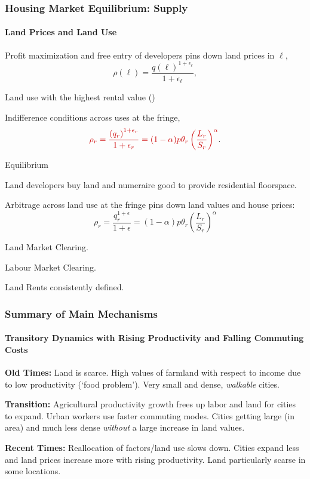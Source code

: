 \documentclass[aspectratio=169]{beamer}
\begin{document}
\begin{v75mins}
\begin{frame}
\frametitle{Housing Market Equilibrium: Supply}
\framesubtitle{Land Prices and Land Use}
\bi
\item Profit maximization and free entry of developers pins down land prices in $\ell$,
\begin{equation*}
\rho(\ell)=\frac{q(\ell)^{1+\epsilon_{\ell}}}{ 1+\epsilon_{\ell}},
\end{equation*}
\item Land use with the highest rental value ()
\item Indifference conditions across uses at the fringe,
\begin{equation*}
 \re{\rho_r=\frac{\left( q_r \right)^{1+\epsilon_r}}{1+\epsilon_r} = (1-\alpha)p\theta_r\left(\frac{L_r}{S_r}\right)^{\alpha} }.
\end{equation*}
\ei
\end{frame}
\end{v75mins}


\begin{frame}{Equilibrium}

	\begin{midi}
		\item Land developers buy land and numeraire good to provide residential floorspace.
		\item Arbitrage across land use at the fringe pins down land values and house prices:
		\begin{equation*}
			\rho_r = \frac{q_r^{1+\epsilon}}{1+\epsilon} = (1-\alpha)p \theta_r \left(\frac{L_r}{S_r}\right)^\alpha
		\end{equation*}
		\item Land Market Clearing.
		\item Labour Market Clearing.
		\item Land Rents consistently defined.
	\end{midi}

\end{frame}

\begin{frame}
	\frametitle{Summary of Main Mechanisms}
	\framesubtitle{Transitory Dynamics with Rising Productivity and Falling Commuting Costs}
	
	\begin{widei}
	\item<1-> \textbf{Old Times:} Land is scarce. High values of farmland with respect to income due to low productivity (`food problem'). Very small and dense, \emph{walkable} cities.
	\item<2-> \textbf{Transition:} Agricultural productivity growth frees up labor and land for cities to expand. Urban workers use faster commuting modes. Cities getting large (in area) and much less dense \emph{without} a large increase in land values.
	\item<3-> \textbf{Recent Times:} Reallocation of factors/land use slows down. Cities expand less and land prices increase more with rising productivity. Land particularly scarse in some locations.
	\end{widei}
	\end{frame}
\end{document}
